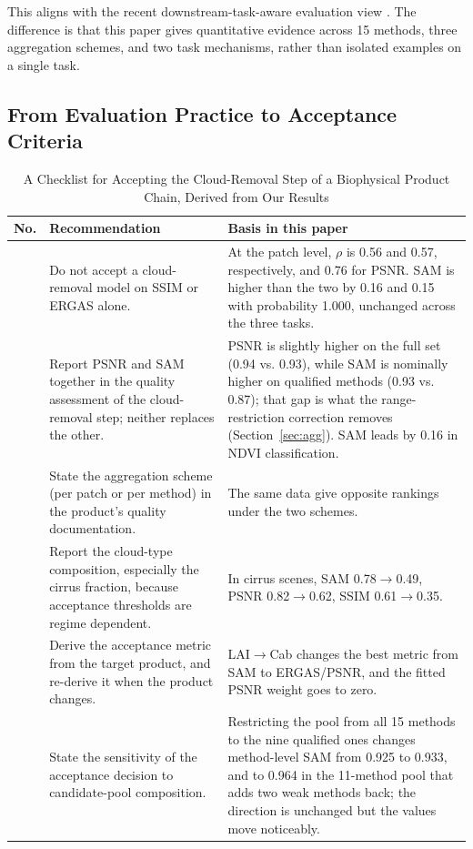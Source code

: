 \documentclass[a4paper,fleqn]{cas-dc}
\begin{document}
This aligns with the recent downstream-task-aware evaluation view \cite{ref10}. The difference is that this paper gives quantitative evidence across 15 methods, three aggregation schemes, and two task mechanisms, rather than isolated examples on a single task.

\subsection{From Evaluation Practice to Acceptance Criteria}

\begin{table}[!t]
\renewcommand{\arraystretch}{1.05}
\caption{A Checklist for Accepting the Cloud-Removal Step of a Biophysical Product Chain, Derived from Our Results\label{tab:13}}
\centering
\scriptsize
\setlength{\tabcolsep}{4pt}
\begin{tabular}{@{}>{\centering\arraybackslash}p{0.18in}>{\raggedright\arraybackslash}p{1.28in}>{\raggedright\arraybackslash}p{1.55in}@{}}
\hline
\textbf{No.} & \textbf{Recommendation} & \textbf{Basis in this paper} \\
\hline
1 & Do not accept a cloud-removal model on SSIM or ERGAS alone. & At the patch level, $\rho$ is 0.56 and 0.57, respectively, and 0.76 for PSNR. SAM is higher than the two by 0.16 and 0.15 with probability 1.000, unchanged across the three tasks. \\
2 & Report PSNR and SAM together in the quality assessment of the cloud-removal step; neither replaces the other. & PSNR is slightly higher on the full set (0.94 vs. 0.93), while SAM is nominally higher on qualified methods (0.93 vs. 0.87); that gap is what the range-restriction correction removes (Section~\ref{sec:agg}). SAM leads by 0.16 in NDVI classification. \\
3 & State the aggregation scheme (per patch or per method) in the product's quality documentation. & The same data give opposite rankings under the two schemes. \\
4 & Report the cloud-type composition, especially the cirrus fraction, because acceptance thresholds are regime dependent. & In cirrus scenes, SAM 0.78$\rightarrow$0.49, PSNR 0.82$\rightarrow$0.62, SSIM 0.61$\rightarrow$0.35. \\
5 & Derive the acceptance metric from the target product, and re-derive it when the product changes. & LAI$\rightarrow$Cab changes the best metric from SAM to ERGAS/PSNR, and the fitted PSNR weight goes to zero. \\
6 & State the sensitivity of the acceptance decision to candidate-pool composition. & Restricting the pool from all 15 methods to the nine qualified ones changes method-level SAM from 0.925 to 0.933, and to 0.964 in the 11-method pool that adds two weak methods back; the direction is unchanged but the values move noticeably. \\

\end{tabular}
\end{table}
\end{document}
